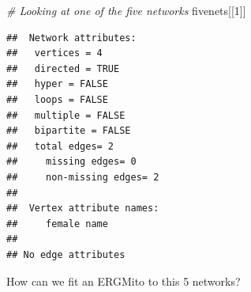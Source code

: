 \documentclass[10pt,ignorenonframetext,aspectratio=169,]{beamer}
\newenvironment{Shaded}{\begin{snugshade}}{\end{snugshade}}
\newcommand{\CommentTok}[1]{\textcolor[rgb]{0.56,0.35,0.01}{\textit{#1}}}
\newcommand{\DecValTok}[1]{\textcolor[rgb]{0.00,0.00,0.81}{#1}}
\newcommand{\NormalTok}[1]{#1}
\begin{document}
\begin{frame}[fragile]

\scriptsize

\begin{Shaded}
\begin{Highlighting}[]
\CommentTok{# Looking at one of the five networks}
\NormalTok{fivenets[[}\DecValTok{1}\NormalTok{]]}
\end{Highlighting}
\end{Shaded}

\begin{verbatim}
##  Network attributes:
##   vertices = 4 
##   directed = TRUE 
##   hyper = FALSE 
##   loops = FALSE 
##   multiple = FALSE 
##   bipartite = FALSE 
##   total edges= 2 
##     missing edges= 0 
##     non-missing edges= 2 
## 
##  Vertex attribute names: 
##     female name 
## 
## No edge attributes
\end{verbatim}

\normalsize

\pause How can we fit an ERGMito to this 5 networks?

\end{frame}
\end{document}
